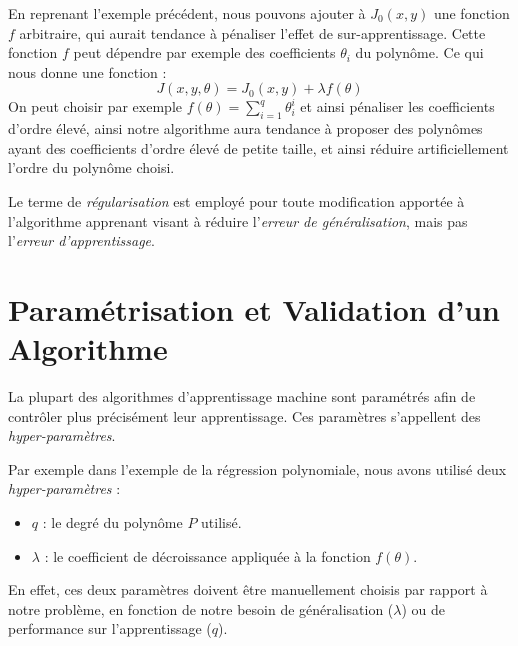 \documentclass[a4paper, 11pt]{report}
\begin{document}
En reprenant l'exemple précédent, nous pouvons ajouter à $J_0(x,y)$ une fonction $f$ arbitraire, qui aurait tendance à pénaliser l'effet de sur-apprentissage.
Cette fonction $f$ peut dépendre par exemple des coefficients $\theta_i$ du polynôme.
Ce qui nous donne une fonction :
$$J(x,y,\theta) = J_0(x,y) + \lambda f(\theta)$$
On peut choisir par exemple $f(\theta) = \sum_{i=1}^{q}{\theta_i^i}$ et ainsi pénaliser les coefficients d'ordre élevé, ainsi notre algorithme aura tendance à proposer des polynômes ayant des coefficients d'ordre élevé de petite taille, et ainsi réduire artificiellement l'ordre du polynôme choisi.

Le terme de \emph{régularisation} est employé pour toute modification apportée à l'algorithme apprenant visant à réduire l'\emph{erreur de généralisation}, mais pas l'\emph{erreur d'apprentissage}.
	
\section{Paramétrisation et Validation d'un Algorithme}
La plupart des algorithmes d'apprentissage machine sont paramétrés afin de contrôler plus précisément leur apprentissage.
Ces paramètres s'appellent des \emph{hyper-paramètres}.

Par exemple dans l'exemple de la régression polynomiale, nous avons utilisé deux \emph{hyper-paramètres} :
\begin{itemize}
	\item $q$ : le degré du polynôme $P$ utilisé.
	\item $\lambda$ : le coefficient de décroissance appliquée à la fonction $f(\theta)$.
\end{itemize}
En effet, ces deux paramètres doivent être manuellement choisis par rapport à notre problème, en fonction de notre besoin de généralisation ($\lambda$) ou de performance sur l'apprentissage ($q$).
\end{document}
